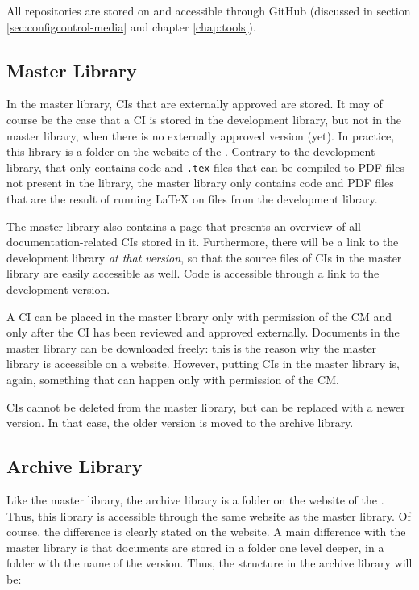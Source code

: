All repositories are stored on and accessible through GitHub (discussed in section \ref{sec:configcontrol-media} and chapter \ref{chap:tools}).

\subsection{Master Library}
In the master library, CIs that are externally approved are stored. It may of course be the case that a CI is stored in the development library, but not in the master library, when there is no externally approved version (yet). In practice, this library is a folder on the website of the \applicationname{}. Contrary to the development library, that only contains code and \texttt{.tex}-files that can be compiled to PDF files not present in the library, the master library only contains code and PDF files that are the result of running \LaTeX{} on files from the development library.

The master library also contains a page that presents an overview of all documentation-related CIs stored in it. Furthermore, there will be a link to the development library \emph{at that version}, so that the source files of CIs in the master library are easily accessible as well. Code is accessible through a link to the development version.

A CI can be placed in the master library only with permission of the CM and only after the CI has been reviewed and approved externally. Documents in the master library can be downloaded freely: this is the reason why the master library is accessible on a website. However, putting CIs in the master library is, again, something that can happen only with permission of the CM.

CIs cannot be deleted from the master library, but can be replaced with a newer version. In that case, the older version is moved to the archive library.

\subsection{Archive Library}
Like the master library, the archive library is a folder on the website of the \applicationname{}. Thus, this library is accessible through the same website as the master library. Of course, the difference is clearly stated on the website. A main difference with the master library is that documents are stored in a folder one level deeper, in a folder with the name of the version. Thus, the structure in the archive library will be:

